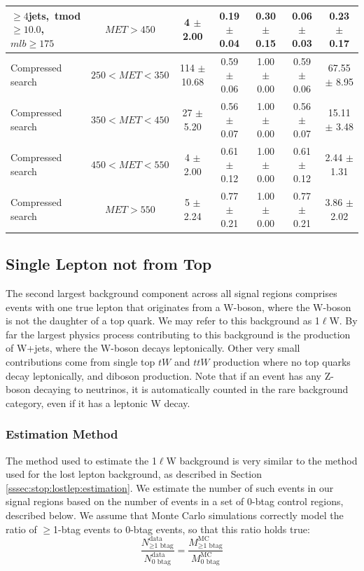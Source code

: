 \begin{table}
\begin{tabular}{|l|c|c|c|c|c|c|}
 $\ge4$jets,~tmod$\ge10.0$,~$mlb\ge175$ & $MET>450$  & 4 $\pm$ 2.00  & 0.19 $\pm$ 0.04  & 0.30 $\pm$ 0.15 & 0.06 $\pm$ 0.03  & 0.23 $\pm$ 0.17  \\
\hline
Compressed search & $250<MET<350$  & 114 $\pm$ 10.68  & 0.59 $\pm$ 0.06 & 1.00 $\pm$ 0.00 & 0.59 $\pm$ 0.06  & 67.55 $\pm$ 8.95  \\
Compressed search & $350<MET<450$  &  27 $\pm$ 5.20   & 0.56 $\pm$ 0.07 & 1.00 $\pm$ 0.00 & 0.56 $\pm$ 0.07  & 15.11 $\pm$ 3.48  \\
Compressed search & $450<MET<550$  &   4 $\pm$ 2.00   & 0.61 $\pm$ 0.12 & 1.00 $\pm$ 0.00 & 0.61 $\pm$ 0.12  &  2.44 $\pm$ 1.31  \\
Compressed search & $MET>550$      &   5 $\pm$ 2.24   & 0.77 $\pm$ 0.21 & 1.00 $\pm$ 0.00 & 0.77 $\pm$ 0.21  &  3.86 $\pm$ 2.02  \\
\hline
\end{tabular}
\end{table}

\subsection{Single Lepton not from Top}
\label{ssec:stop:1lw}

The second largest background component across all signal regions
comprises events with one true lepton that originates from a W-boson,
where the W-boson is not the daughter of a top quark. We may refer to
this background as 1$\ell$W. By far the
largest physics process contributing to this background is the
production of W+jets, where the W-boson decays leptonically. Other
very small contributions come from single top $tW$ and $ttW$
production where no top quarks decay leptonically, and diboson
production. Note that if an event has any Z-boson decaying to
neutrinos, it is automatically counted in the rare background
category, even if it has a leptonic W decay.

\subsubsection{Estimation Method}
\label{sssec:stop:1lw:estimation}

The method used to estimate the 1$\ell$W background is very similar to
the method used for the lost lepton background, as described in
Section \ref{sssec:stop:lostlep:estimation}. We estimate the number of
such events in our signal regions based on the number of events in a
set of 0-btag control regions, described below. We assume that Monte
Carlo simulations correctly model the ratio of $\geq$1-btag events to
0-btag events, so that this ratio holds true:
\begin{equation}
\label{eq:stop:1lw:rationm}
\frac{N_{\geq\text{1 btag}}^\text{data}}{N_\text{0 btag}^\text{data}} = \frac{M_{\geq\text{1 btag}}^\text{MC}}{M_\text{0 btag}^\text{MC}}
\end{equation}

